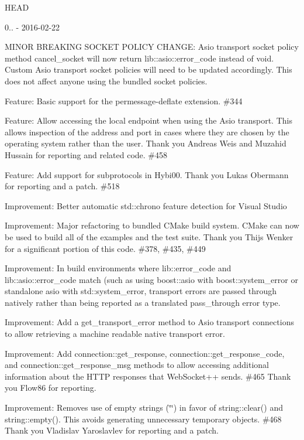 H\+E\+AD

0.. -\/ 2016-\/02-\/22
\begin{DoxyItemize}
\item M\+I\+N\+OR B\+R\+E\+A\+K\+I\+NG S\+O\+C\+K\+ET P\+O\+L\+I\+CY C\+H\+A\+N\+GE\+: Asio transport socket policy method {\ttfamily cancel\+\_\+socket} will now return {\ttfamily lib\+::asio\+::error\+\_\+code} instead of {\ttfamily void}. Custom Asio transport socket policies will need to be updated accordingly. This does not affect anyone using the bundled socket policies.
\item Feature\+: Basic support for the permessage-\/deflate extension. \#344
\item Feature\+: Allow accessing the local endpoint when using the Asio transport. This allows inspection of the address and port in cases where they are chosen by the operating system rather than the user. Thank you Andreas Weis and Muzahid Hussain for reporting and related code. \#458
\item Feature\+: Add support for subprotocols in Hybi00. Thank you Lukas Obermann for reporting and a patch. \#518
\item Improvement\+: Better automatic std\+::chrono feature detection for Visual Studio
\item Improvement\+: Major refactoring to bundled C\+Make build system. C\+Make can now be used to build all of the examples and the test suite. Thank you Thijs Wenker for a significant portion of this code. \#378, \#435, \#449
\item Improvement\+: In build environments where {\ttfamily lib\+::error\+\_\+code} and {\ttfamily lib\+::asio\+::error\+\_\+code} match (such as using {\ttfamily boost\+::asio} with {\ttfamily boost\+::system\+\_\+error} or standalone asio with {\ttfamily std\+::system\+\_\+error}, transport errors are passed through natively rather than being reported as a translated {\ttfamily pass\+\_\+through} error type.
\item Improvement\+: Add a {\ttfamily get\+\_\+transport\+\_\+error} method to Asio transport connections to allow retrieving a machine readable native transport error.
\item Improvement\+: Add {\ttfamily connection\+::get\+\_\+response}, {\ttfamily connection\+::get\+\_\+response\+\_\+code}, and {\ttfamily connection\+::get\+\_\+response\+\_\+msg} methods to allow accessing additional information about the H\+T\+TP responses that Web\+Socket++ sends. \#465 Thank you Flow86 for reporting.
\item Improvement\+: Removes use of empty strings (\char`\"{}\char`\"{}) in favor of {\ttfamily string\+::clear()} and {\ttfamily string\+::empty()}. This avoids generating unnecessary temporary objects. \#468 Thank you Vladislav Yaroslavlev for reporting and a patch.

\end{DoxyItemize}
